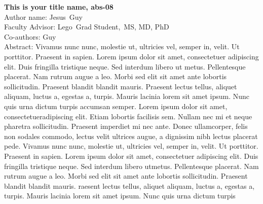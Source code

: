 \documentclass[float=false, crop=false]{standalone}
\begin{document}
\textbf{This is your title name, abs-08}\\\noindent
Author name: Jesus~Guy \\\noindent
Faculty Advisor: Lego~Grad Student,~MS, MD, PhD\\\noindent
Co-authors: Guy \\\noindent
Abstract: Vivamus nunc nunc, molestie ut, ultricies vel, semper in, velit. Ut porttitor. Praesent in sapien. Lorem ipsum dolor sit amet, consectetuer adipiscing elit. Duis fringilla tristique neque. Sed interdum libero ut metus. Pellentesque placerat. Nam rutrum augue a leo. Morbi sed elit sit amet ante lobortis sollicitudin. Praesent blandit blandit mauris. Praesent lectus tellus, aliquet aliquam, luctus a, egestas a, turpis. Mauris lacinia lorem sit amet ipsum. Nunc quis urna dictum turpis accumsan semper. Lorem ipsum dolor sit amet, consectetueradipiscing elit. Etiam lobortis facilisis sem. Nullam nec mi et neque pharetra sollicitudin. Praesent imperdiet mi nec ante. Donec ullamcorper, felis non sodales commodo, lectus velit ultrices augue, a dignissim nibh lectus placerat pede. Vivamus nunc nunc, molestie ut, ultricies vel, semper in, velit. Ut porttitor. Praesent in sapien. Lorem ipsum dolor sit amet, consectetuer adipiscing elit. Duis fringilla tristique neque. Sed interdum libero utmetus. Pellentesque placerat. Nam rutrum augue a leo. Morbi sed elit sit amet ante lobortis sollicitudin. Praesent blandit blandit mauris. raesent lectus tellus, aliquet aliquam, luctus a, egestas a, turpis. Mauris lacinia lorem sit amet ipsum. Nunc quis urna dictum turpis\\\newline
\end{document}
